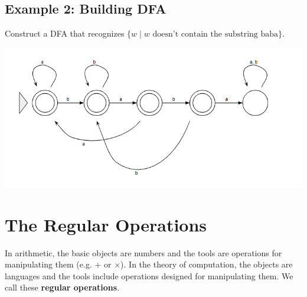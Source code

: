 \documentclass[letterpaper]{article}
\begin{document}
\subsection{Example 2: Building DFA}
Construct a DFA that recognizes $\{w \mid w \text{ doesn't contain the substring baba}\}$.

\begin{mdframed}[]
    \begin{center}
        \includegraphics[scale=0.7]{../assets/not_baba_state.png}
    \end{center}
\end{mdframed}

\newpage
\section{The Regular Operations}
In arithmetic, the basic objects are numbers and the tools are operations for manipulating them (e.g. $+$ or $\times$). In the theory of computation, the objects are languages and the tools include operations designed for manipulating them. We call these \textbf{regular operations}.
\end{document}

